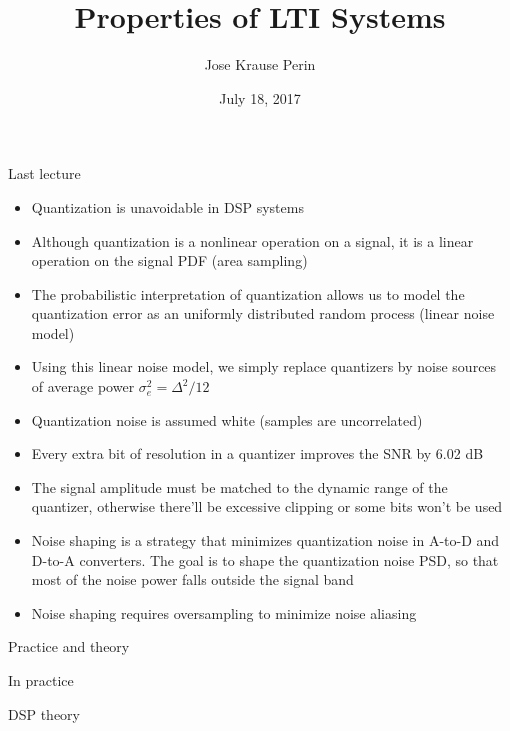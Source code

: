 \documentclass[10pt]{beamer}
\title[EE 264]{Properties of LTI Systems}
\author{Jose Krause Perin}
\institute{Stanford University}
\date{July 18, 2017}
\begin{document}
\begin{frame}
  \titlepage
\end{frame}

%

%
\begin{frame}{Last lecture}
\begin{itemize}
	\item Quantization is unavoidable in DSP systems
	\item Although quantization is a nonlinear operation on a signal, it is a linear operation on the signal PDF (area sampling)
	\item The probabilistic interpretation of quantization allows us to model the quantization error as an uniformly distributed random process (linear noise model)
	\item Using this linear noise model, we simply replace quantizers by noise sources of average power $\sigma_e^2 = \Delta^2/12$
	\item Quantization noise is assumed white (samples are uncorrelated)
	\item Every extra bit of resolution in a quantizer improves the SNR by 6.02 dB
	\item The signal amplitude must be matched to the dynamic range of the quantizer, otherwise there'll be excessive clipping or some bits won't be used
	\item Noise shaping is a strategy that minimizes quantization noise in A-to-D and D-to-A converters. The goal is to shape the quantization noise PSD, so that most of the noise power falls outside the signal band
	\item Noise shaping requires oversampling to minimize noise aliasing
\end{itemize}
\end{frame}

%
\begin{frame}{Practice and theory}
\begin{block}{In practice}
	\begin{center}
		\resizebox{\linewidth}{!}{}
	\end{center}
\end{block}

\begin{block}{DSP theory}
	\begin{center}
		\resizebox{\linewidth}{!}{}
	\end{center}
\end{block}
\end{frame}
\end{document}
